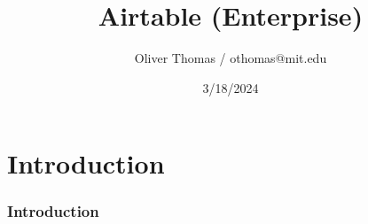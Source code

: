 \documentclass{beamer}
\title{Airtable (Enterprise)}
\author{Oliver Thomas / othomas@mit.edu}
\date{3/18/2024}
\begin{document}
\begin{frame}
\titlepage
\end{frame}

\section{Introduction}
\begin{frame}
\frametitle{Introduction}
\end{frame}
\end{document}
